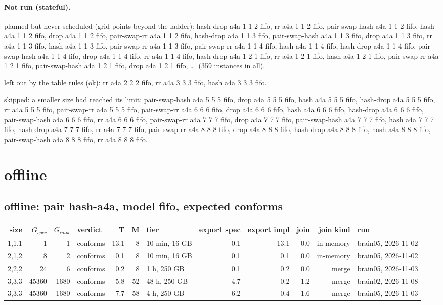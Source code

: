 \documentclass[10pt]{article}
\begin{document}
\paragraph{Not run (stateful).}
planned but never scheduled (grid points beyond the ladder): hash-drop a4a 1 1 2 fifo, rr a4a 1 1 2 fifo, pair-swap-hash a4a 1 1 2 fifo, hash a4a 1 1 2 fifo, drop a4a 1 1 2 fifo, pair-swap-rr a4a 1 1 2 fifo, hash-drop a4a 1 1 3 fifo, pair-swap-hash a4a 1 1 3 fifo, drop a4a 1 1 3 fifo, rr a4a 1 1 3 fifo, hash a4a 1 1 3 fifo, pair-swap-rr a4a 1 1 3 fifo, pair-swap-rr a4a 1 1 4 fifo, hash a4a 1 1 4 fifo, hash-drop a4a 1 1 4 fifo, pair-swap-hash a4a 1 1 4 fifo, drop a4a 1 1 4 fifo, rr a4a 1 1 4 fifo, hash-drop a4a 1 2 1 fifo, rr a4a 1 2 1 fifo, hash a4a 1 2 1 fifo, pair-swap-rr a4a 1 2 1 fifo, pair-swap-hash a4a 1 2 1 fifo, drop a4a 1 2 1 fifo, \ldots\ (359 instances in all).\par
left out by the table rules (ok): rr a4a 2 2 2 fifo, rr a4a 3 3 3 fifo, hash a4a 3 3 3 fifo.\par
skipped: a smaller size had reached its limit: pair-swap-hash a4a 5 5 5 fifo, drop a4a 5 5 5 fifo, hash a4a 5 5 5 fifo, hash-drop a4a 5 5 5 fifo, rr a4a 5 5 5 fifo, pair-swap-rr a4a 5 5 5 fifo, pair-swap-rr a4a 6 6 6 fifo, drop a4a 6 6 6 fifo, hash a4a 6 6 6 fifo, hash-drop a4a 6 6 6 fifo, pair-swap-hash a4a 6 6 6 fifo, rr a4a 6 6 6 fifo, pair-swap-rr a4a 7 7 7 fifo, drop a4a 7 7 7 fifo, pair-swap-hash a4a 7 7 7 fifo, hash a4a 7 7 7 fifo, hash-drop a4a 7 7 7 fifo, rr a4a 7 7 7 fifo, pair-swap-rr a4a 8 8 8 fifo, drop a4a 8 8 8 fifo, hash-drop a4a 8 8 8 fifo, hash a4a 8 8 8 fifo, pair-swap-hash a4a 8 8 8 fifo, rr a4a 8 8 8 fifo.\par
\section*{offline}
\subsection*{offline: pair \textsf{hash-a4a}, model fifo, expected conforms}
\begin{longtable}{@{}rrrlrrlrrrrl@{}}
\toprule
size & $G_{\mathit{spec}}$ & $G_{\mathit{impl}}$ & verdict & T & M & tier & export spec & export impl & join & join kind & run \\
\midrule
\endhead
\color{red} 1,1,1 & 1 & 1 & conforms & 13.1 & 8 & 10 min, 16 GB & 0.1 & 13.1 & 0.0 & in-memory & brain05, 2026-11-02 \\
\color{red} 2,1,2 & 8 & 2 & conforms & 0.1 & 8 & 10 min, 16 GB & 0.1 & 0.1 & 0.0 & in-memory & brain05, 2026-11-02 \\
\color{blue} 2,2,2 & 24 & 6 & conforms & 0.2 & 8 & 1 h, 250 GB & 0.1 & 0.2 & 0.0 & merge & brain05, 2026-11-03 \\
\color{blue} 3,3,3 & 45360 & 1680 & conforms & 5.8 & 52 & 48 h, 250 GB & 4.7 & 0.2 & 1.2 & merge & brain02, 2026-11-08 \\
\color{blue} 3,3,3 & 45360 & 1680 & conforms & 7.7 & 58 & 4 h, 250 GB & 6.2 & 0.4 & 1.6 & merge & brain05, 2026-11-03 \\
\bottomrule
\end{longtable}
\end{document}
